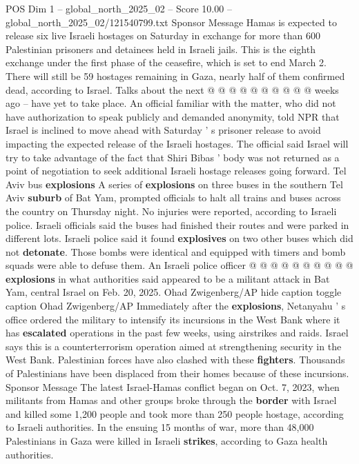 \begin{textsample}{POS Dim 1 – global\_north\_2025\_02 – Score 10.00 – global\_north\_2025\_02/121540799.txt}
Sponsor Message Hamas is expected to release six live Israeli hostages on Saturday in exchange for more than 600 Palestinian prisoners and detainees held in Israeli jails.
This is the eighth exchange under the first phase of the ceasefire, which is set to end March 2.
There will still be 59 hostages remaining in Gaza, nearly half of them confirmed dead, according to Israel.
Talks about the next @ @ @ @ @ @ @ @ @ @ weeks ago -- have yet to take place.
An official familiar with the matter, who did not have authorization to speak publicly and demanded anonymity, told NPR that Israel is inclined to move ahead with Saturday ' s prisoner release to avoid impacting the expected release of the Israeli hostages.
The official said Israel will try to take advantage of the fact that Shiri Bibas ' body was not returned as a point of negotiation to seek additional Israeli hostage releases going forward.
Tel Aviv bus \textbf{explosions} A series of \textbf{explosions} on three buses in the southern Tel Aviv \textbf{suburb} of Bat Yam, prompted officials to halt all trains and buses across the country on Thursday night.
No injuries were reported, according to Israeli police.
Israeli officials said the buses had finished their routes and were parked in different lots.
Israeli police said it found \textbf{explosives} on two other buses which did not \textbf{detonate}.
Those bombs were identical and equipped with timers and bomb squads were able to defuse them.
An Israeli police officer @ @ @ @ @ @ @ @ @ @ \textbf{explosions} in what authorities said appeared to be a militant attack in Bat Yam, central Israel on Feb. 20, 2025.
Ohad Zwigenberg/AP hide caption toggle caption Ohad Zwigenberg/AP Immediately after the \textbf{explosions}, Netanyahu ' s office ordered the military to intensify its incursions in the West Bank where it has \textbf{escalated} operations in the past few weeks, using airstrikes and raids.
Israel says this is a counterterrorism operation aimed at strengthening security in the West Bank.
Palestinian forces have also clashed with these \textbf{fighters}.
Thousands of Palestinians have been displaced from their homes because of these incursions.
Sponsor Message The latest Israel-Hamas conflict began on Oct. 7, 2023, when militants from Hamas and other groups broke through the \textbf{border} with Israel and killed some 1,200 people and took more than 250 people hostage, according to Israeli authorities.
In the ensuing 15 months of war, more than 48,000 Palestinians in Gaza were killed in Israeli \textbf{strikes}, according to Gaza health authorities.

\end{textsample}
